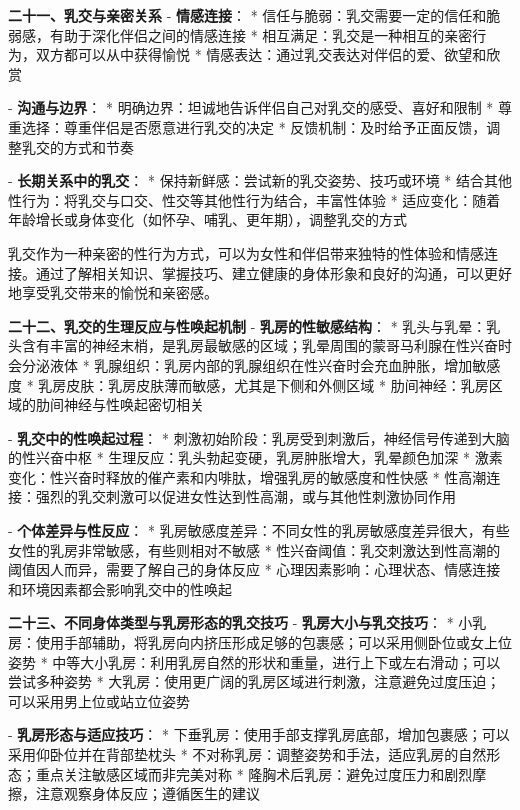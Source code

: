 \begin{enumerate}
  \textbf{二十一、乳交与亲密关系}
  - \textbf{情感连接}：
    * 信任与脆弱：乳交需要一定的信任和脆弱感，有助于深化伴侣之间的情感连接
    * 相互满足：乳交是一种相互的亲密行为，双方都可以从中获得愉悦
    * 情感表达：通过乳交表达对伴侣的爱、欲望和欣赏

  - \textbf{沟通与边界}：
    * 明确边界：坦诚地告诉伴侣自己对乳交的感受、喜好和限制
    * 尊重选择：尊重伴侣是否愿意进行乳交的决定
    * 反馈机制：及时给予正面反馈，调整乳交的方式和节奏

  - \textbf{长期关系中的乳交}：
    * 保持新鲜感：尝试新的乳交姿势、技巧或环境
    * 结合其他性行为：将乳交与口交、性交等其他性行为结合，丰富性体验
    * 适应变化：随着年龄增长或身体变化（如怀孕、哺乳、更年期），调整乳交的方式

乳交作为一种亲密的性行为方式，可以为女性和伴侣带来独特的性体验和情感连接。通过了解相关知识、掌握技巧、建立健康的身体形象和良好的沟通，可以更好地享受乳交带来的愉悦和亲密感。

  \textbf{二十二、乳交的生理反应与性唤起机制}
  - \textbf{乳房的性敏感结构}：
    * 乳头与乳晕：乳头含有丰富的神经末梢，是乳房最敏感的区域；乳晕周围的蒙哥马利腺在性兴奋时会分泌液体
    * 乳腺组织：乳房内部的乳腺组织在性兴奋时会充血肿胀，增加敏感度
    * 乳房皮肤：乳房皮肤薄而敏感，尤其是下侧和外侧区域
    * 肋间神经：乳房区域的肋间神经与性唤起密切相关

  - \textbf{乳交中的性唤起过程}：
    * 刺激初始阶段：乳房受到刺激后，神经信号传递到大脑的性兴奋中枢
    * 生理反应：乳头勃起变硬，乳房肿胀增大，乳晕颜色加深
    * 激素变化：性兴奋时释放的催产素和内啡肽，增强乳房的敏感度和性快感
    * 性高潮连接：强烈的乳交刺激可以促进女性达到性高潮，或与其他性刺激协同作用

  - \textbf{个体差异与性反应}：
    * 乳房敏感度差异：不同女性的乳房敏感度差异很大，有些女性的乳房非常敏感，有些则相对不敏感
    * 性兴奋阈值：乳交刺激达到性高潮的阈值因人而异，需要了解自己的身体反应
    * 心理因素影响：心理状态、情感连接和环境因素都会影响乳交中的性唤起

  \textbf{二十三、不同身体类型与乳房形态的乳交技巧}
  - \textbf{乳房大小与乳交技巧}：
    * 小乳房：使用手部辅助，将乳房向内挤压形成足够的包裹感；可以采用侧卧位或女上位姿势
    * 中等大小乳房：利用乳房自然的形状和重量，进行上下或左右滑动；可以尝试多种姿势
    * 大乳房：使用更广阔的乳房区域进行刺激，注意避免过度压迫；可以采用男上位或站立位姿势

  - \textbf{乳房形态与适应技巧}：
    * 下垂乳房：使用手部支撑乳房底部，增加包裹感；可以采用仰卧位并在背部垫枕头
    * 不对称乳房：调整姿势和手法，适应乳房的自然形态；重点关注敏感区域而非完美对称
    * 隆胸术后乳房：避免过度压力和剧烈摩擦，注意观察身体反应；遵循医生的建议


\end{enumerate}
